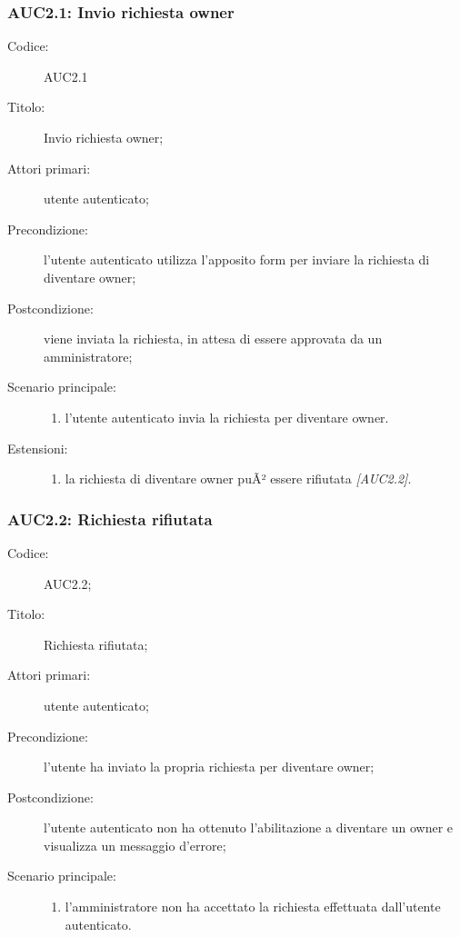 \documentclass[../../../analisi-dei-requisiti.tex]{subfiles}
\begin{document}
\subsubsection{AUC2.1: Invio richiesta owner}%
\label{subs:AUC2.1}
\begin{description}
  \item[Codice:] AUC2.1
  \item[Titolo:] Invio richiesta owner;
  \item[Attori primari:] utente autenticato;
  \item[Precondizione:] l'utente autenticato utilizza l'apposito form per inviare la richiesta di diventare owner;
  \item[Postcondizione:] viene inviata la richiesta, in attesa di essere approvata da un amministratore;
  \item[Scenario principale:]
  \begin{enumerate}
    \item l'utente autenticato invia la richiesta per diventare owner.
  \end{enumerate}
  \item[Estensioni:]
  \begin{enumerate}
    \item la richiesta di diventare owner puÃ² essere rifiutata \emph{[AUC2.2]}.
  \end{enumerate}
\end{description}

\subsubsection{AUC2.2: Richiesta rifiutata}%
\label{subs:AUC2.2}
\begin{description}
  \item[Codice:] AUC2.2;
  \item[Titolo:] Richiesta rifiutata;
  \item[Attori primari:] utente autenticato;
  \item[Precondizione:] l'utente ha inviato la propria richiesta per diventare owner;
  \item[Postcondizione:] l'utente autenticato non ha ottenuto l'abilitazione a diventare un owner e visualizza un messaggio d'errore;
  \item[Scenario principale:]
  \begin{enumerate}
    \item l'amministratore non ha accettato la richiesta effettuata dall'utente autenticato.
  \end{enumerate}
\end{description}
\end{document}
